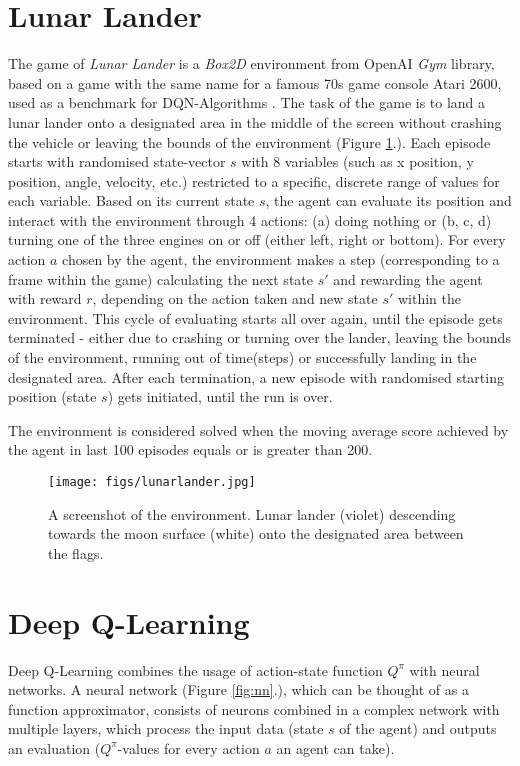 \documentclass{article}
\begin{document}
\section{Lunar Lander}
The game of \textit{Lunar Lander} is a \textit{Box2D} environment from OpenAI \textit{Gym} library, based on a game with the same name for a famous 70s game console Atari 2600, used as a benchmark for DQN-Algorithms \cite{brockman2016openai}. The task of the game is to land a lunar lander onto a designated area in the middle of the screen without crashing the vehicle or leaving the bounds of the environment (Figure \ref{fig:lunarlander}.). Each episode starts with randomised state-vector $s$ with 8 variables (such as x position, y position, angle, velocity, etc.) restricted to a specific, discrete range of values for each variable. Based on its current state $s$, the agent can evaluate its position and interact with the environment through 4 actions: (a) doing nothing or (b, c, d) turning one of the three engines on or off (either left, right or bottom). For every action $a$ chosen by the agent, the environment makes a step (corresponding to a frame within the game) calculating the next state $s'$ and rewarding the agent with reward $r$, depending on the action taken and new state $s'$ within the environment. This cycle of evaluating starts all over again, until the episode gets terminated - either due to crashing or turning over the lander, leaving the bounds of the environment, running out of time(steps) or successfully landing in the designated area. After each termination, a new episode with randomised starting position (state $s$) gets initiated, until the run is over.

The environment is considered solved when the moving average score achieved by the agent in last 100 episodes equals or is greater than 200.\\

\begin{figure}[h]
    \centering
    \texttt{[image: figs/lunarlander.jpg]}
    \caption{A screenshot of the environment. Lunar lander (violet) descending towards the moon surface (white) onto the designated area between the flags.}
    \label{fig:lunarlander}
\end{figure}

\section{Deep Q-Learning}
Deep Q-Learning combines the usage of action-state function $Q^\pi$ with neural networks. A neural network (Figure \ref{fig:nn}.), which can be thought of as a function approximator, consists of neurons combined in a complex network with multiple layers, which process the input data (state $s$ of the agent) and outputs an evaluation ($Q^{\pi}$-values for every action $a$ an agent can take).
\end{document}
